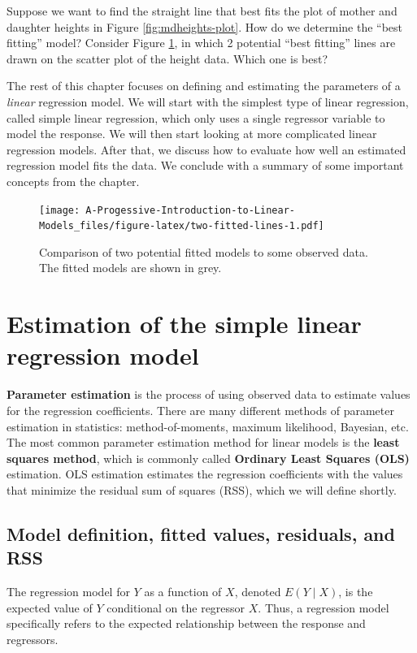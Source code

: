 \documentclass[
]{book}
\theoremstyle{definition}
\theoremstyle{definition}
\theoremstyle{definition}
\theoremstyle{definition}
\theoremstyle{remark}
\begin{document}
Suppose we want to find the straight line that best fits the plot of mother and daughter heights in Figure \ref{fig:mdheights-plot}. How do we determine the ``best fitting'' model? Consider Figure \ref{fig:two-fitted-lines}, in which 2 potential ``best fitting'' lines are drawn on the scatter plot of the height data. Which one is best?

The rest of this chapter focuses on defining and estimating the parameters of a \emph{linear} regression model. We will start with the simplest type of linear regression, called simple linear regression, which only uses a single regressor variable to model the response. We will then start looking at more complicated linear regression models. After that, we discuss how to evaluate how well an estimated regression model fits the data. We conclude with a summary of some important concepts from the chapter.

\begin{figure}
\centering
\texttt{[image: A-Progessive-Introduction-to-Linear-Models\_files/figure-latex/two-fitted-lines-1.pdf]}
\caption{\label{fig:two-fitted-lines}Comparison of two potential fitted models to some observed data. The fitted models are shown in grey.}
\end{figure}

\hypertarget{s-slr-estimation}{%
\section{Estimation of the simple linear regression model}\label{s-slr-estimation}}

\textbf{Parameter estimation} is the process of using observed data to estimate values for the regression coefficients. There are many different methods of parameter estimation in statistics: method-of-moments, maximum likelihood, Bayesian, etc. The most common parameter estimation method for linear models is the \textbf{least squares method}, which is commonly called \textbf{Ordinary Least Squares (OLS)} estimation. OLS estimation estimates the regression coefficients with the values that minimize the residual sum of squares (RSS), which we will define shortly.

\hypertarget{ss:fv-resid-rss}{%
\subsection{Model definition, fitted values, residuals, and RSS}\label{ss:fv-resid-rss}}

The regression model for \(Y\) as a function of \(X\), denoted \(E(Y \mid X)\), is the expected value of \(Y\) conditional on the regressor \(X\). Thus, a regression model specifically refers to the expected relationship between the response and regressors.
\end{document}
